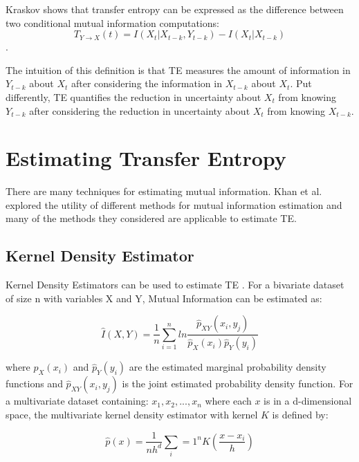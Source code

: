 \documentclass[conference]{IEEEtran}
\begin{document}
\noindent Kraskov \cite{kraskovEstimator} shows that transfer entropy can be expressed as the difference between two conditional mutual information computations: \begin{equation} T_{Y \rightarrow X}(t) = I(X_t | X_{t-k}, Y_{t-k}) -  I(X_t | X_{t-k})  \end{equation} .

The intuition of this definition is that TE measures the amount of information in \(Y_{t-k}\) about \(X_t\) after  considering the information in \(X_{t-k}\) about \(X_t\). Put differently, TE quantifies the reduction in uncertainty about \(X_t\) from knowing \(Y_{t-k}\) after considering the reduction in uncertainty about \(X_t\) from knowing \(X_{t-k}\).

\section{Estimating Transfer Entropy}

There are many techniques for estimating mutual information. Khan et al. explored the utility of different methods for mutual information estimation \cite{EstimatingTE} and many of the methods they considered are applicable to estimate TE.

\subsection{Kernel Density Estimator}
Kernel Density Estimators can be used to estimate TE \cite{KDE}. For a bivariate dataset of size n with variables X and Y, Mutual Information can be estimated as:

\begin{equation}\hat{I}(X,Y) = \frac{1}{n} \sum_{i=1}^n ln \frac{\hat{p}_{XY}(x_i, y_j)  } {\hat{p}_X(x_i) \hat{p}_Y(y_i)}  \end{equation}

\noindent where \(\hat{p}_X(x_i)\) and \( \hat{p}_Y(y_i)\) are the estimated marginal probability density functions and  \(\hat{p}_{XY}(x_i, y_j)\) is the joint estimated probability density function. For a multivariate dataset containing: \(x_1, x_2, ..., x_n\) where each \(x\) is in a d-dimensional space, the multivariate kernel density estimator with kernel \(K\) is defined by:

\begin{equation}\hat{p}(x) = \frac{1}{nh^d} \sum_i=1^n K(\frac{x-x_i}{h}  )\end{equation}
\end{document}
